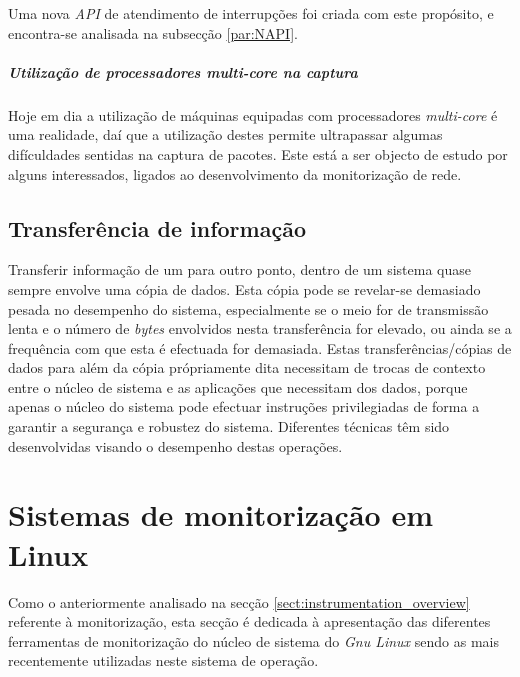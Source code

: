 Uma nova \textit{API} de atendimento de interrupções foi criada com este propósito, e encontra-se analisada na subsecção \ref{par:NAPI}.

\subparagraph*{Utilização de processadores \textit{multi-core} na captura}
Hoje em dia a utilização de máquinas equipadas com processadores \textit{multi-core} é uma realidade, daí que a utilização destes permite ultrapassar algumas difículdades sentidas na captura de pacotes.
Este está a ser objecto de estudo por alguns interessados, ligados ao desenvolvimento da monitorização de rede.


\subsection{Transferência de informação}\label{sect:transf_information}


Transferir informação de um para outro ponto, dentro de um sistema quase sempre envolve uma cópia de dados.
Esta cópia pode se revelar-se demasiado pesada no desempenho do sistema, especialmente se o meio for de transmissão lenta e o número de \textit{bytes} envolvidos nesta transferência for elevado, ou ainda se a frequência com que esta é efectuada for demasiada.
Estas transferências/cópias de dados para além da cópia própriamente dita necessitam de trocas de contexto entre o núcleo de sistema e as aplicações que necessitam dos dados, porque apenas o núcleo do sistema pode efectuar instruções privilegiadas de forma a garantir a segurança e robustez do sistema.
Diferentes técnicas têm sido desenvolvidas visando o desempenho destas operações. 




\section{Sistemas de monitorização em Linux}\label{sect:instrumentacao_casos_linux}

Como o anteriormente analisado na secção \ref{sect:instrumentation_overview} referente à monitorização, esta secção é dedicada à apresentação das diferentes ferramentas de monitorização do núcleo de sistema do \textit{Gnu Linux} sendo as mais recentemente utilizadas neste sistema de operação.

